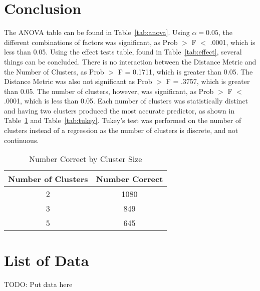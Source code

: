 \documentclass[times]{article}
\begin{document}
   \section{Conclusion}

   The ANOVA table can be found in Table~\ref{tab:anova}.
   Using $\alpha = 0.05$, the different combinations of factors was significant, as
   Prob $>$ F $<$ .0001, which is less than 0.05.
   Using the effect tests table, found in Table~\ref{tab:effect}, several things can be concluded.
   There is no interaction between the Distance Metric and the Number
   of Clusters, as Prob $>$ F = 0.1711, which is greater than 0.05.
   The Distance Metric was also not significant as Prob $>$ F = .3757, which is greater than 0.05.
   The number of clusters, however, was significant, as Prob $>$ F $<$ .0001, which is less than 0.05.
   Each number of clusters was statistically distinct and having two clusters produced the most 
   accurate predictor, as shown in Table~\ref{tab:by_cluster} and Table~\ref{tab:tukey}.  
   Tukey's test was performed on the number of clusters instead of a regression as the number of
   clusters is discrete, and not continuous.
   
   \begin{table}[H]
      \centering
      \caption{Number Correct by Cluster Size}
      \label{tab:by_cluster}
      \begin{tabular}{| c | c |}
         \hline
         Number of Clusters & Number Correct \\
         \hline
         2 & 1080 \\
         \hline
         3 & 849 \\
         \hline
         5 & 645 \\
         \hline
      \end{tabular}
   \end{table}

   \appendix
   \section{List of Data}

   TODO: Put data here
\end{document}
